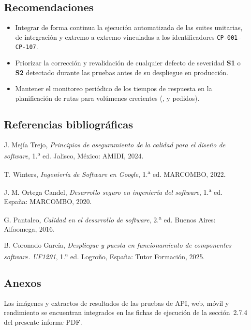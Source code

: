 \documentclass[11pt]{article}
\let\oldtexttt\texttt
\renewcommand{\texttt}[1]{\oldtexttt{\hyphenchar\font=45\relax #1}}
\renewcommand{\_}{\textunderscore\allowbreak}
\begin{document}
\subsection{Recomendaciones}
\begin{itemize}
    \item Integrar de forma continua la ejecución automatizada de las suites unitarias, de integración y extremo a extremo vinculadas a los identificadores \texttt{CP-001}--\texttt{CP-107}.
    \item Priorizar la corrección y revalidación de cualquier defecto de severidad \textbf{S1} o \textbf{S2} detectado durante las pruebas antes de su despliegue en producción.
    \item Mantener el monitoreo periódico de los tiempos de respuesta en la planificación de rutas para volúmenes crecientes (\texttt{100}, \texttt{500} y \texttt{2000} pedidos).
\end{itemize}

\subsection{Referencias bibliográficas}
\begin{enumerate}[label={[\arabic*]}]
    \item J. Mejía Trejo, \textit{Principios de aseguramiento de la calidad para el diseño de software}, 1.\textsuperscript{a} ed. Jalisco, México: AMIDI, 2024.
    \item T. Winters, \textit{Ingeniería de Software en Google}, 1.\textsuperscript{a} ed. MARCOMBO, 2022.
    \item J. M. Ortega Candel, \textit{Desarrollo seguro en ingeniería del software}, 1.\textsuperscript{a} ed. España: MARCOMBO, 2020.
    \item G. Pantaleo, \textit{Calidad en el desarrollo de software}, 2.\textsuperscript{a} ed. Buenos Aires: Alfaomega, 2016.
    \item B. Coronado García, \textit{Despliegue y puesta en funcionamiento de componentes software. UF1291}, 1.\textsuperscript{a} ed. Logroño, España: Tutor Formación, 2025.
\end{enumerate}

\subsection{Anexos}
Las imágenes y extractos de resultados de las pruebas de API, web, móvil y rendimiento se
encuentran integrados en las fichas de ejecución de la sección~2.7.4 del presente informe PDF.
\end{document}
